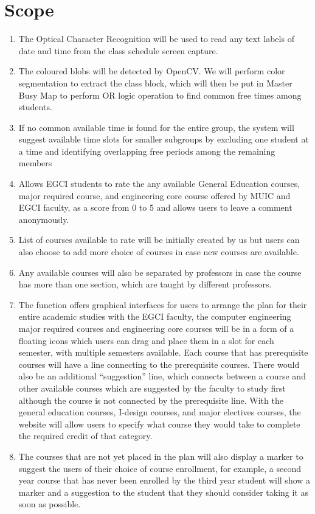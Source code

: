 \section{Scope}
\begin{enumerate}
    \item The Optical Character Recognition will be used to read any text labels of date and time from the class schedule screen capture.
    
    \item The coloured blobs will be detected by OpenCV. We will perform color segmentation to extract the class block, which will then be put in Master Busy Map to perform OR logic operation to find common free times among students.
    
    \item If no common available time is found for the entire group, the system will suggest available time slots for smaller subgroups by excluding one student at a time and identifying overlapping free periods among the remaining members
    
    \item Allows EGCI students to rate the any available General Education courses, major required course, and engineering core course offered by MUIC and EGCI faculty, as a score from 0 to 5 and allows users to leave a comment anonymously.
    
    \item List of courses available to rate will be initially created by us but users can also choose to add more choice of courses in case new courses are available.
    \item Any available courses will also be separated by professors in case the course has more than one section, which are taught by different professors.
    \item The function offers graphical interfaces for users to arrange the plan for their entire academic studies with the EGCI faculty, the computer engineering major required courses and engineering core courses will be in a form of a floating icons which users can drag and place them in a slot for each semester, with multiple semesters available. Each course that has prerequisite courses will have a line connecting to the prerequisite courses. There would also be an additional “suggestion” line, which connects between a course and other available courses which are suggested by the faculty to study first although the course is not connected by the prerequisite line. With the general education courses, I-design courses, and major electives courses, the website will allow users to specify what course they would take to complete the required credit of that category.
    \item The courses that are not yet placed in the plan will also display a marker to suggest the users of their choice of course enrollment, for example, a second year course that has never been enrolled by the third year student will show a marker and a suggestion to the student that they should consider taking it as soon as possible.
    
\end{enumerate}

